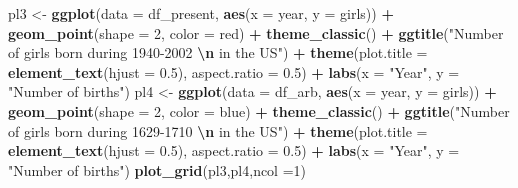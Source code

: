 \documentclass[11pt,a4paper,]{article}
\newenvironment{Shaded}{\begin{snugshade}}{\end{snugshade}}
\newcommand{\AttributeTok}[1]{\textcolor[rgb]{0.13,0.29,0.53}{#1}}
\newcommand{\DecValTok}[1]{\textcolor[rgb]{0.00,0.00,0.81}{#1}}
\newcommand{\FloatTok}[1]{\textcolor[rgb]{0.00,0.00,0.81}{#1}}
\newcommand{\FunctionTok}[1]{\textcolor[rgb]{0.13,0.29,0.53}{\textbf{#1}}}
\newcommand{\NormalTok}[1]{#1}
\newcommand{\OtherTok}[1]{\textcolor[rgb]{0.56,0.35,0.01}{#1}}
\newcommand{\SpecialCharTok}[1]{\textcolor[rgb]{0.81,0.36,0.00}{\textbf{#1}}}
\newcommand{\StringTok}[1]{\textcolor[rgb]{0.31,0.60,0.02}{#1}}
\begin{document}
\begin{Shaded}
\begin{Highlighting}[]
\NormalTok{pl3 }\OtherTok{\textless{}{-}} \FunctionTok{ggplot}\NormalTok{(}\AttributeTok{data =}\NormalTok{ df\_present, }\FunctionTok{aes}\NormalTok{(}\AttributeTok{x =}\NormalTok{ year, }\AttributeTok{y =}\NormalTok{ girls)) }\SpecialCharTok{+}
  \FunctionTok{geom\_point}\NormalTok{(}\AttributeTok{shape =} \DecValTok{2}\NormalTok{, }\AttributeTok{color =} \StringTok{\textquotesingle{}red\textquotesingle{}}\NormalTok{) }\SpecialCharTok{+} \FunctionTok{theme\_classic}\NormalTok{() }\SpecialCharTok{+} 
  \FunctionTok{ggtitle}\NormalTok{(}\StringTok{"Number of girls born during 1940{-}2002 }\SpecialCharTok{\textbackslash{}n}\StringTok{ in the US"}\NormalTok{) }\SpecialCharTok{+} 
  \FunctionTok{theme}\NormalTok{(}\AttributeTok{plot.title =} \FunctionTok{element\_text}\NormalTok{(}\AttributeTok{hjust =} \FloatTok{0.5}\NormalTok{), }\AttributeTok{aspect.ratio =} \FloatTok{0.5}\NormalTok{) }\SpecialCharTok{+} \FunctionTok{labs}\NormalTok{(}\AttributeTok{x =} \StringTok{"Year"}\NormalTok{, }
                                                                           \AttributeTok{y =} \StringTok{"Number of births"}\NormalTok{)}
\NormalTok{pl4 }\OtherTok{\textless{}{-}} \FunctionTok{ggplot}\NormalTok{(}\AttributeTok{data =}\NormalTok{ df\_arb, }\FunctionTok{aes}\NormalTok{(}\AttributeTok{x =}\NormalTok{ year, }\AttributeTok{y =}\NormalTok{ girls)) }\SpecialCharTok{+}
  \FunctionTok{geom\_point}\NormalTok{(}\AttributeTok{shape =} \DecValTok{2}\NormalTok{, }\AttributeTok{color =} \StringTok{\textquotesingle{}blue\textquotesingle{}}\NormalTok{) }\SpecialCharTok{+} \FunctionTok{theme\_classic}\NormalTok{() }\SpecialCharTok{+} 
  \FunctionTok{ggtitle}\NormalTok{(}\StringTok{"Number of girls born during 1629{-}1710 }\SpecialCharTok{\textbackslash{}n}\StringTok{ in the US"}\NormalTok{) }\SpecialCharTok{+} 
  \FunctionTok{theme}\NormalTok{(}\AttributeTok{plot.title =} \FunctionTok{element\_text}\NormalTok{(}\AttributeTok{hjust =} \FloatTok{0.5}\NormalTok{), }\AttributeTok{aspect.ratio =} \FloatTok{0.5}\NormalTok{) }\SpecialCharTok{+} \FunctionTok{labs}\NormalTok{(}\AttributeTok{x =} \StringTok{"Year"}\NormalTok{, }
                                                                           \AttributeTok{y =} \StringTok{"Number of births"}\NormalTok{)}
\FunctionTok{plot\_grid}\NormalTok{(pl3,pl4,}\AttributeTok{ncol =}\DecValTok{1}\NormalTok{)}
\end{Highlighting}
\end{Shaded}
\end{document}
